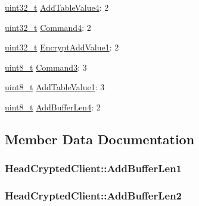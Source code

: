 \begin{DoxyCompactItemize}
\item 
\hyperlink{stdint_8h_a435d1572bf3f880d55459d9805097f62}{uint32\+\_\+t} \hyperlink{structHeadCryptedClient_a2503b16d2f10efe10380d1db0e41652e}{Add\+Table\+Value4}\+: 2
\item 
\hyperlink{stdint_8h_a435d1572bf3f880d55459d9805097f62}{uint32\+\_\+t} \hyperlink{structHeadCryptedClient_a1cfcf027682f486f3fecf1ae01df43e7}{Command4}\+: 2
\item 
\hyperlink{stdint_8h_a435d1572bf3f880d55459d9805097f62}{uint32\+\_\+t} \hyperlink{structHeadCryptedClient_aa331779a9e406430ab74ea527da77e30}{Encrypt\+Add\+Value1}\+: 2
\item 
\hyperlink{stdint_8h_aba7bc1797add20fe3efdf37ced1182c5}{uint8\+\_\+t} \hyperlink{structHeadCryptedClient_a24f3808b5e6ed9f9d84fea0ec68a9078}{Command3}\+: 3
\item 
\hyperlink{stdint_8h_aba7bc1797add20fe3efdf37ced1182c5}{uint8\+\_\+t} \hyperlink{structHeadCryptedClient_afbd47bd518252a95e7e6eca5b09cbf7c}{Add\+Table\+Value1}\+: 3
\item 
\hyperlink{stdint_8h_aba7bc1797add20fe3efdf37ced1182c5}{uint8\+\_\+t} \hyperlink{structHeadCryptedClient_af4de1697d94f486a5fda7270ec2f1b4c}{Add\+Buffer\+Len4}\+: 2
\end{DoxyCompactItemize}


\subsection{Member Data Documentation}
\subsubsection[{\texorpdfstring{Add\+Buffer\+Len1}{AddBufferLen1}}]{ Head\+Crypted\+Client\+::\+Add\+Buffer\+Len1}\hypertarget{structHeadCryptedClient_a4024d60a84c300f6baa228b0425ff70f}{}\label{structHeadCryptedClient_a4024d60a84c300f6baa228b0425ff70f}
\subsubsection[{\texorpdfstring{Add\+Buffer\+Len2}{AddBufferLen2}}]{ Head\+Crypted\+Client\+::\+Add\+Buffer\+Len2}\hypertarget{structHeadCryptedClient_a9cd34a8cdbf5e60e00e2258d176e0fc9}{}\label{structHeadCryptedClient_a9cd34a8cdbf5e60e00e2258d176e0fc9}
